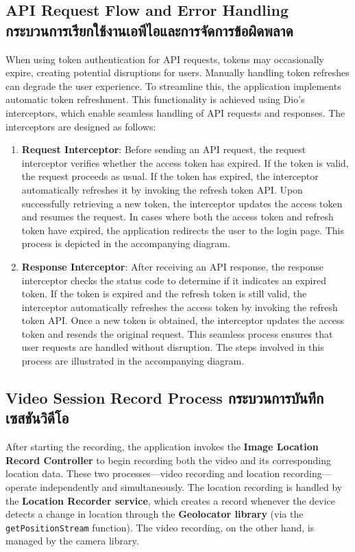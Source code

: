 \subsection{\ifenglish API Request Flow and Error Handling \else กระบวนการเรียกใช้งานเอพีไอและการจัดการข้อผิดพลาด \fi}
When using token authentication for API requests, tokens may occasionally expire, creating potential disruptions for users. Manually handling token refreshes can degrade the user experience. To streamline this, the application implements automatic token refreshment. This functionality is achieved using Dio’s interceptors, which enable seamless handling of API requests and responses. The interceptors are designed as follows:
\begin{enumerate}
    \item \textbf{Request Interceptor}: Before sending an API request, the request interceptor verifies whether the access token has expired. If the token is valid, the request proceeds as usual. If the token has expired, the interceptor automatically refreshes it by invoking the refresh token API. Upon successfully retrieving a new token, the interceptor updates the access token and resumes the request. In cases where both the access token and refresh token have expired, the application redirects the user to the login page. This process is depicted in the accompanying diagram.  

    \item \textbf{Response Interceptor}: After receiving an API response, the response interceptor checks the status code to determine if it indicates an expired token. If the token is expired and the refresh token is still valid, the interceptor automatically refreshes the access token by invoking the refresh token API. Once a new token is obtained, the interceptor updates the access token and resends the original request. This seamless process ensures that user requests are handled without disruption. The steps involved in this process are illustrated in the accompanying diagram.      
\end{enumerate}
\subsection{\ifenglish Video Session Record Process \else กระบวนการบันทึกเซสชันวิดีโอ \fi}
After starting the recording, the application invokes the \textbf{Image Location Record Controller} to begin recording both the video and its corresponding location data. These two processes—video recording and location recording—operate independently and simultaneously. The location recording is handled by the \textbf{Location Recorder service}, which creates a record whenever the device detects a change in location through the \textbf{Geolocator library} (via the \texttt{getPositionStream} function). The video recording, on the other hand, is managed by the camera library.

